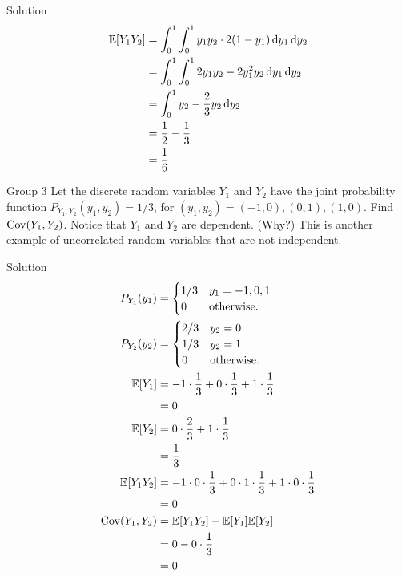 \documentclass{article}
\begin{document}
\begin{solution}
    {Solution}
    \begin{align*}
        \E{Y_1Y_2}
        &= \int_{0}^{1}\int_{0}^{1}y_1y_2\cdot 2(1-y_1)\diff y_1\diff y_2 \\
        &= \int_{0}^{1}\int_{0}^{1}2y_1y_2-2y_1^2y_2\diff y_1\diff y_2 \\
        &= \int_{0}^{1}y_2-\frac{2}{3}y_2\diff y_2 \\
        &= \frac{1}{2}-\frac{1}{3} \\
        &= \frac{1}{6}
    \end{align*}
\end{solution}

\begin{problem}
    {Group 3}
    Let the discrete random variables $Y_1$ and $Y_2$ have the joint probability function $P_{Y_1,Y_2}(y_1, y_2) = 1/3$, for $(y_1, y_2) = (-1, 0), (0, 1), (1, 0)$. Find $\mathop{\mathrm{Cov}}\nolimits(Y_1, Y_2)$. Notice that $Y_1$ and $Y_2$ are dependent. (Why?) This is another example of uncorrelated random variables that are not independent.
\end{problem}

\begin{solution}
    {Solution}
    \begin{align*}
        P_{Y_1}(y_1) &= {
            \begin{cases}
                1/3 & y_1=-1, 0, 1 \\
                0 & \text{otherwise.}
            \end{cases}
        }\\
        P_{Y_2}(y_2) &= {
            \begin{cases}
                2/3 & y_2=0 \\
                1/3 & y_2=1 \\
                0 & \text{otherwise.}
            \end{cases}
        }\\
        \E{Y_1}
        &= -1\cdot\frac{1}{3}+0\cdot\frac{1}{3}+1\cdot\frac{1}{3} \\
        &= 0 \\
        \E{Y_2}
        &= 0\cdot\frac{2}{3}+1\cdot\frac{1}{3} \\
        &= \frac{1}{3} \\
        \E{Y_1Y_2}
        &= -1\cdot 0\cdot\frac{1}{3}+0\cdot 1\cdot\frac{1}{3}+1\cdot 0\cdot\frac{1}{3} \\
        &= 0 \\
        \Cov(Y_1,Y_2)
        &= \E{Y_1Y_2}-\E{Y_1}\E{Y_2} \\
        &= 0-0\cdot\frac{1}{3} \\
        &= 0
    \end{align*}
\end{solution}
\end{document}
